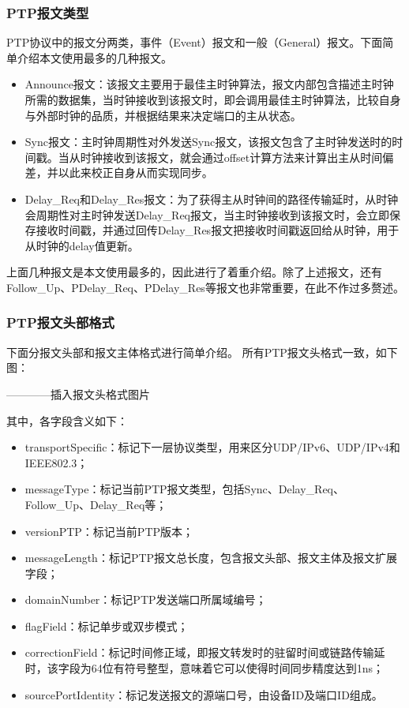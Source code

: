 \subsubsection{PTP报文类型}
PTP协议中的报文分两类，事件（Event）报文和一般（General）报文。下面简单介绍本文使用最多的几种报文。
\begin{itemize}[noitemsep,topsep=0pt,parsep=0pt,partopsep=0pt]
	\item Announce报文：该报文主要用于最佳主时钟算法，报文内部包含描述主时钟所需的数据集，当时钟接收到该报文时，即会调用最佳主时钟算法，比较自身与外部时钟的品质，并根据结果来决定端口的主从状态。
	\item Sync报文：主时钟周期性对外发送Sync报文，该报文包含了主时钟发送时的时间戳。当从时钟接收到该报文，就会通过offset计算方法来计算出主从时间偏差，并以此来校正自身从而实现同步。
	\item Delay\_Req和Delay\_Res报文：为了获得主从时钟间的路径传输延时，从时钟会周期性对主时钟发送Delay\_Req报文，当主时钟接收到该报文时，会立即保存接收时间戳，并通过回传Delay\_Res报文把接收时间戳返回给从时钟，用于从时钟的delay值更新。
\end{itemize}
上面几种报文是本文使用最多的，因此进行了着重介绍。除了上述报文，还有Follow\_Up、PDelay\_Req、PDelay\_Res等报文也非常重要，在此不作过多赘述。

\subsubsection{PTP报文头部格式}
下面分报文头部和报文主体格式进行简单介绍。
所有PTP报文头格式一致，如下图：

————插入报文头格式图片

其中，各字段含义如下：
\begin{itemize}[noitemsep,topsep=0pt,parsep=0pt,partopsep=0pt]
	\item transportSpecific：标记下一层协议类型，用来区分UDP/IPv6、UDP/IPv4和IEEE802.3；
	\item messageType：标记当前PTP报文类型，包括Sync、Delay\_Req、Follow\_Up、Delay\_Req等；
	\item versionPTP：标记当前PTP版本；
	\item messageLength：标记PTP报文总长度，包含报文头部、报文主体及报文扩展字段；
	\item domainNumber：标记PTP发送端口所属域编号；
	\item flagField：标记单步或双步模式；
	\item correctionField：标记时间修正域，即报文转发时的驻留时间或链路传输延时，该字段为64位有符号整型，意味着它可以使得时间同步精度达到1ns；
	\item sourcePortIdentity：标记发送报文的源端口号，由设备ID及端口ID组成。
\end{itemize}

